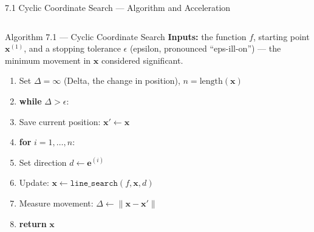 \documentclass[aspectratio=169,10pt]{beamer}
\begin{document}
\begin{frame}[allowframebreaks]{7.1 Cyclic Coordinate Search --- Algorithm and Acceleration}
  \begin{columns}[T]
      \begin{alertblock}{Algorithm 7.1 --- Cyclic Coordinate Search}
        \textbf{Inputs:} the function $f$, starting point
        $\mathbf{x}^{(1)}$, and a stopping tolerance $\epsilon$
        (epsilon, pronounced ``eps-ill-on'') --- the minimum movement
        in $\mathbf{x}$ considered significant.

        \begin{enumerate}\setlength\itemsep{2pt}
          \item Set $\Delta = \infty$ (Delta, the change in position),
                $n = \text{length}(\mathbf{x})$
          \item \textbf{while} $\Delta > \epsilon$:
          \item \quad Save current position: $\mathbf{x}' \leftarrow \mathbf{x}$
          \item \quad \textbf{for} $i = 1,\ldots,n$:
          \item \qquad Set direction $d \leftarrow \mathbf{e}^{(i)}$
          \item \qquad Update: $\mathbf{x} \leftarrow \texttt{line\_search}(f,\mathbf{x},d)$
          \item \quad Measure movement: $\Delta \leftarrow \|\mathbf{x} - \mathbf{x}'\|$
          \item \textbf{return} $\mathbf{x}$
        \end{enumerate}
      \end{alertblock}


\end{columns}
\end{frame}
\end{document}
